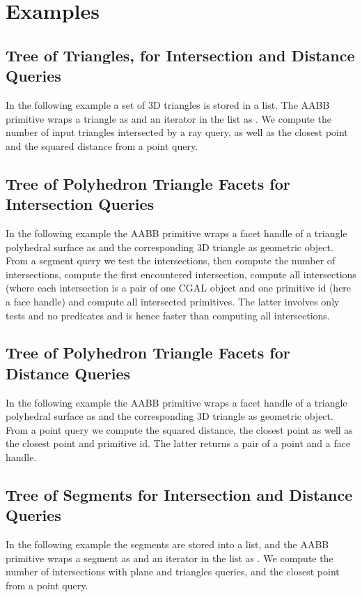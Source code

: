 \section{Examples}
\label{AABB_tree_section_examples}

\subsection{Tree of Triangles, for Intersection and Distance Queries}
In the following example a set of 3D triangles is stored in a list. The AABB primitive wraps a triangle as  and an iterator in the list as . We compute the number of input triangles intersected by a ray query, as well as the closest point and the squared distance from a point query.

\subsection{Tree of Polyhedron Triangle Facets for Intersection Queries}
In the following example the AABB primitive wraps a facet handle of a triangle polyhedral surface as  and the corresponding 3D triangle as geometric object. From a segment query we test the intersections, then compute the number of intersections, compute the first encountered intersection, compute all intersections (where each intersection is a pair of one CGAL object and one primitive id (here a face handle) and compute all intersected primitives. The latter  involves only tests and no predicates and is hence faster than computing all intersections.

\subsection{Tree of Polyhedron Triangle Facets for Distance Queries}
In the following example the AABB primitive wraps a facet handle of a triangle polyhedral surface as  and the corresponding 3D triangle as geometric object. From a point query we compute the squared distance, the closest point as well as the closest point and primitive id. The latter returns a pair of a point and a face handle. 

\subsection{Tree of Segments for Intersection and Distance Queries}
In the following example the segments are stored into a list, and the AABB primitive wraps a segment as  and an iterator in the list as . We compute the number of intersections with plane and triangles queries, and the closest point from a point query. 

